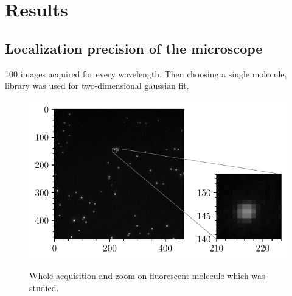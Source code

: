 \section{Results}
\subsection{Localization precision of the microscope}
100 images acquired for every wavelength.
Then choosing a single molecule,  library was used for two-dimensional gaussian fit.

\begin{figure}[htbp]
    \includegraphics[scale=1]{figures/beads_inset_zoom.pdf}
    \label{fig:beads_inset_zoom}
    \caption{Whole acquisition and zoom on fluorescent molecule which was studied.}
\end{figure}


